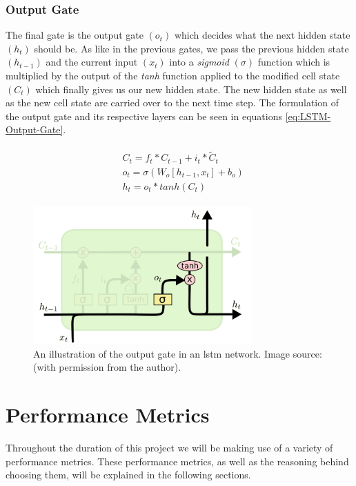 \subsubsection{Output Gate}
\label{subsubsec:Background-Information:Forecasting-Models:Long-Short-Term-Memory-Networks:Output-Gate}
The final gate is the output gate $(o_t)$ which decides what the next hidden state $(h_t)$ should be. As like in the previous gates, we pass the previous hidden state $(h_{t-1})$ and the current input $(x_t)$ into a \textit{sigmoid} $(\sigma)$ function which is multiplied by the output of the \textit{tanh} function applied to the modified cell state $(C_t)$ which finally gives us our new hidden state. The new hidden state as well as the new cell state are carried over to the next time step. The formulation of the output gate and its respective layers can be seen in equations \ref{eq:LSTM-Output-Gate}.

\begin{align}
    \begin{split}
        & C_t = f_t * C_{t-1} + i_t * \tilde{C}_t \\
        & o_t = \sigma (W_o \left[h_{t-1}, x_t \right] + b_o) \\
        & h_t = o_t * tanh(C_t)
    \end{split}
\label{eq:LSTM-Output-Gate}
\end{align}

\begin{figure}[H]
    \centering
    \includegraphics[width=0.75\textwidth]{Images/Chapter 3/LSTM/LSTM-Output-Gate-Illustration.png}
    \caption{An illustration of the output gate in an \gls{lstm} network. Image source: \cite{Colah}  (with permission from the author).}
    \label{fig:LSTM-Output-Gate-Illustration}
\end{figure}

\clearpage

\section{Performance Metrics}
\label{sec:Background-Information:Performance-Metrics}
Throughout the duration of this project we will be making use of a variety of performance metrics. These performance metrics, as well as the reasoning behind choosing them, will be explained in the following sections.

